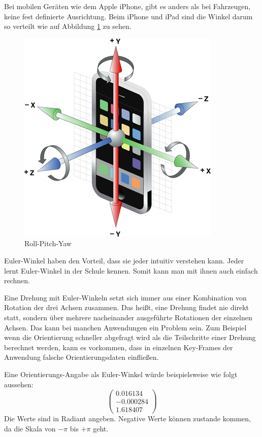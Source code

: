Bei mobilen Geräten wie dem Apple iPhone, gibt es anders als bei Fahrzeugen, keine fest definierte Ausrichtung. Beim iPhone und iPad sind die Winkel darum so verteilt wie auf Abbildung \ref{fig:apple-axes} zu sehen.

\begin{figure}[htb]
\centering
\includegraphics[scale=0.8]{figures/apple-axes}
\caption{Roll-Pitch-Yaw \cite{apple:001}}
\label{fig:apple-axes}
\end{figure}

Euler-Winkel haben den Vorteil, dass sie jeder intuitiv verstehen kann. Jeder lernt Euler-Winkel in der Schule kennen. Somit kann man mit ihnen auch einfach rechnen.

Eine Drehung mit Euler-Winkeln setzt sich immer aus einer Kombination von Rotation der drei Achsen zusammen. Das heißt, eine Drehung findet nie direkt statt, sondern über mehrere nacheinander ausgeführte Rotationen der einzelnen Achsen. Das kann bei manchen Anwendungen ein Problem sein. Zum Beispiel wenn die Orientierung schneller abgefragt wird als die Teilschritte einer Drehung berechnet werden, kann es vorkommen, dass in einzelnen Key-Frames der Anwendung falsche Orientierungsdaten einfließen.

Eine Orientierungs-Angabe als Euler-Winkel würde beispielsweise wie folgt aussehen: 
$$
\begin{pmatrix}
    0.016134\\ 
    -0.000284\\ 
    1.618407
  \end{pmatrix} 
$$
Die Werte sind in Radiant angeben. Negative Werte können zustande kommen, da die Skala von $-\pi$ bis $+\pi$ geht.

